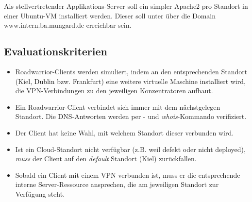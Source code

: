 Als stellvertretender \glqq Applikations-Server\grqq{} soll ein simpler Apache2 pro Standort in einer Ubuntu-VM installiert werden. Dieser soll unter über die Domain www.intern.ba.mungard.de erreichbar sein.
%
\subsection{Evaluationskriterien}
\begin{itemize}
\item Roadwarrior-Clients werden simuliert, indem an den entsprechenden Standort (Kiel, Dublin bzw. Frankfurt) eine weitere virtuelle Maschine installiert wird, die VPN-Verbindungen zu den jeweiligen Konzentratoren aufbaut.
\item Ein Roadwarrior-Client verbindet sich immer mit dem nächstgelegen Standort. Die DNS-Antworten werden per - und \textit{whois}-Kommando verifiziert.
\item Der Client hat keine Wahl, mit welchem Standort dieser verbunden wird.
\item Ist ein Cloud-Standort nicht verfügbar (z.B. weil defekt oder nicht deployed), \textit{muss} der Client auf den \textit{default} Standort (Kiel) zurückfallen.
\item Sobald ein Client mit einem VPN verbunden ist, muss er die entsprechende interne Server-Ressource ansprechen, die am jeweiligen Standort zur Verfügung steht.
\end{itemize}
